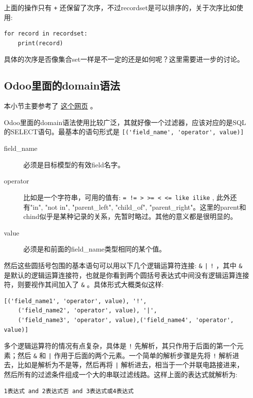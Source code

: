 \documentclass[11pt,a4paper]{sphinxmanual}
\begin{document}
上面的操作只有 \verb~+~ 还保留了次序，不过recordset是可以排序的，关于次序比如使用:
\begin{Verbatim}
for record in recordset:
    print(record)
\end{Verbatim}

具体的次序是否像集合set一样是不一定的还是如何呢？这里需要进一步的讨论。


\subsection{Odoo里面的domain语法}
\label{sec-8-3-2}
本小节主要参考了 \href{http://stackoverflow.com/questions/14608775/how-to-filter-datas-in-openerp-using-domain-list}{这个网页} 。

Odoo里面的domain语法使用比较广泛，其就好像一个过滤器，应该对应的是SQL的SELECT语句。最基本的语句形式是 \verb~[('field_name', 'operator', value)]~

\begin{description}
\item[{field\_name}] 必须是目标模型的有效field名字。
\item[{operator}] 比如是一个字符串，可用的值有: \verb~= != > >= < <= like ilike~ , 此外还有"in", "not in", "parent\_left", "child\_of", "parent\_right"。这里的parent和chind似乎是某种记录的关系，先暂时略过。其他的意义都是很明显的。

\item[{value}] 必须是和前面的field\_name类型相同的某个值。
\end{description}

然后这些圆括号包围的基本语句可以用以下几个逻辑运算符连接: \verb~&~ \verb~|~ \verb~!~ ，其中 \verb~&~ 是默认的逻辑运算连接符，也就是你看到两个圆括号表达式中间没有逻辑运算连接符，则要视作其间加入了 \verb~&~ 。具体形式大概类似这样:

\begin{Verbatim}
[('field_name1', 'operator', value), '!',  
    ('field_name2', 'operator', value), '|', 
    ('field_name3', 'operator', value),('field_name4', 'operator', value)]
\end{Verbatim}

多个逻辑运算符的情况有点复杂，具体是 \verb~!~ 先解析，其只作用于后面的第一个元素；然后 \verb~&~ 和 \verb~|~ 作用于后面的两个元素。一个简单的解析步骤是先将 \verb~!~ 解析进去，比如是解析为不是等，然后再将 \verb~|~ 解析进去，相当于一个并联电路接进来，然后所有的过滤条件组成一个大的串联过滤线路。这样上面的表达式就解析为:

\begin{Verbatim}
1表达式 and 2表达式否 and 3表达式或4表达式
\end{Verbatim}
\end{document}
